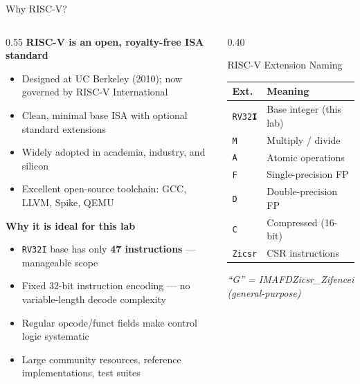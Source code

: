 \documentclass[aspectratio=169,10pt]{beamer}
\begin{document}
\begin{frame}{Why RISC-V?}
  \begin{columns}[T]
    \begin{column}{0.55\textwidth}
      \textbf{RISC-V is an open, royalty-free ISA standard}
      \vspace{0.5em}
      \begin{itemize}
        \item Designed at UC Berkeley (2010); now governed by RISC-V International
        \item Clean, minimal base ISA with optional standard extensions
        \item Widely adopted in academia, industry, and silicon
        \item Excellent open-source toolchain: GCC, LLVM, Spike, QEMU
      \end{itemize}
      \vspace{0.8em}
      \textbf{Why it is ideal for this lab}
      \begin{itemize}
        \item \texttt{RV32I} base has only \textbf{47 instructions} --- manageable scope
        \item Fixed 32-bit instruction encoding --- no variable-length decode complexity
        \item Regular opcode/funct fields make control logic systematic
        \item Large community resources, reference implementations, test suites
      \end{itemize}
    \end{column}
    \begin{column}{0.40\textwidth}
      \begin{block}{RISC-V Extension Naming}
        \centering
        \renewcommand{\arraystretch}{1.3}
        \begin{tabular}{ll}
          \toprule
          Ext. & Meaning \\
          \midrule
          \texttt{RV32\textbf{I}} & Base integer (this lab) \\
          \texttt{M} & Multiply / divide \\
          \texttt{A} & Atomic operations \\
          \texttt{F} & Single-precision FP \\
          \texttt{D} & Double-precision FP \\
          \texttt{C} & Compressed (16-bit) \\
          \texttt{Zicsr} & CSR instructions \\
          \bottomrule
        \end{tabular}
      \end{block}
      \vspace{0.4em}
      \small
      \textit{``G'' = IMAFDZicsr\_Zifencei (general-purpose)}
    \end{column}
  \end{columns}
\end{frame}
\end{document}
